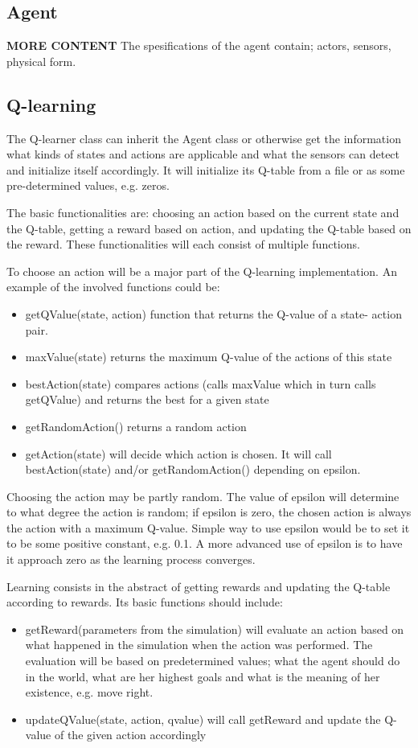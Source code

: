 \documentclass{article}
\begin{document}
\subsection{Agent}
\textbf{MORE CONTENT}
The spesifications of the agent contain; actors, sensors, physical form.


\subsection{Q-learning}
The Q-learner class can inherit the Agent class or otherwise get the information
what kinds of states and actions are applicable and what the sensors can detect
and initialize itself accordingly. It will initialize its Q-table from a file or
as some pre-determined values, e.g. zeros.

The basic functionalities are: choosing an action based on the current state and
the Q-table, getting a reward based on action, and updating the Q-table based on
the reward. These functionalities will each consist of multiple functions.

To choose an action will be a major part of the Q-learning implementation. An
example of the involved functions could be:
\begin{itemize}
  \item getQValue(state, action) function that returns the Q-value of a state-
    action pair.
  \item maxValue(state) returns the maximum Q-value of the actions of this state
  \item bestAction(state) compares actions (calls maxValue which in turn calls
    getQValue) and returns the best for a given state
  \item getRandomAction() returns a random action
  \item getAction(state) will decide which action is chosen. It will call
    bestAction(state) and/or getRandomAction() depending on epsilon.
\end{itemize}
Choosing the action may be partly random. The value of epsilon will determine to
what degree the action is random; if epsilon is zero, the chosen action is always
the action with a maximum Q-value. Simple way to use epsilon would be to set it
to be some positive constant, e.g. 0.1. A more advanced use of epsilon is to have
it approach zero as the learning process converges.

Learning consists in the abstract of getting rewards and updating the Q-table
according to rewards. Its basic functions should include:
\begin{itemize}
  \item getReward(parameters from the simulation) will evaluate an action based
  on what happened in the simulation when the action was performed. The evaluation
  will be based on predetermined values; what the agent should do in the world,
  what are her highest goals and what is the meaning of her existence, e.g. move
  right.
  \item updateQValue(state, action, qvalue) will call getReward and update the
  Q-value of the given action accordingly
\end{itemize}
\end{document}
